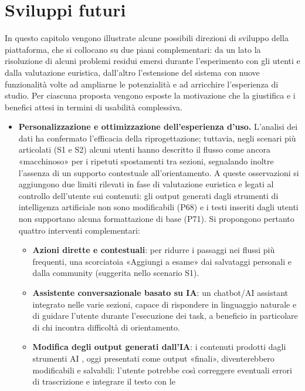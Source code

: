 \section{Sviluppi futuri}
\label{sviluppi_futuri}

In questo capitolo vengono illustrate alcune possibili direzioni di sviluppo
della piattaforma, che si collocano su due piani complementari: da un lato la
risoluzione di alcuni problemi residui emersi durante l'esperimento con gli
utenti e dalla valutazione euristica, dall'altro l'estensione del sistema con nuove funzionalità
volte ad ampliarne le potenzialità e ad arricchire l'esperienza di studio. Per
ciascuna proposta vengono esposte la motivazione che la giustifica e i benefici
attesi in termini di usabilità complessiva.

\begin{itemize}
  \item \textbf{Personalizzazione e ottimizzazione dell'esperienza d'uso.}
  L'analisi dei dati ha confermato l'efficacia della riprogettazione; tuttavia,
  negli scenari più articolati (S1 e S2) alcuni utenti hanno descritto il flusso
  come ancora «macchinoso» per i ripetuti spostamenti tra sezioni, segnalando
  inoltre l'assenza di un supporto contestuale all'orientamento. A queste
  osservazioni si aggiungono due limiti rilevati in fase di valutazione
  euristica e legati al controllo dell'utente sui contenuti: gli output generati
  dagli strumenti di intelligenza artificiale non sono modificabili (P68) e i
  testi inseriti dagli utenti non supportano alcuna formattazione di base (P71).
  Si propongono pertanto quattro interventi complementari:
  \begin{itemize}
    \item \textbf{Azioni dirette e contestuali}: per ridurre i passaggi nei
    flussi più frequenti, una scorciatoia «Aggiungi
    a esame» dai salvataggi personali e dalla community (suggerita nello
    scenario S1).
    \item \textbf{Assistente conversazionale basato su IA}: un chatbot/AI
    assistant integrato nelle varie sezioni, capace di rispondere in linguaggio
    naturale e di guidare l'utente durante l'esecuzione dei task, a beneficio in
    particolare di chi incontra difficoltà di orientamento.
    \item \textbf{Modifica degli output generati dall'IA}: i contenuti prodotti
    dagli strumenti AI , oggi presentati come output
    «finali», diventerebbero modificabili e salvabili: l'utente potrebbe così
    correggere eventuali errori di trascrizione e integrare il testo con le

\end{itemize}
\end{itemize}
